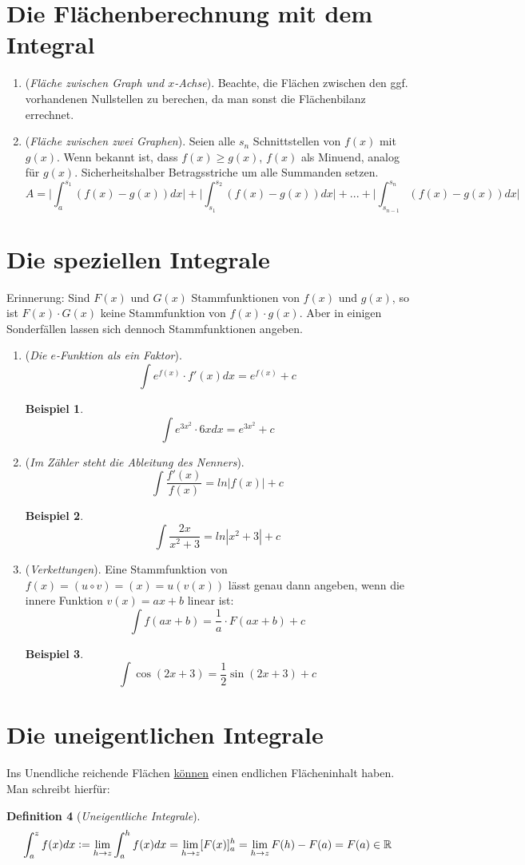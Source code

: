 \documentclass[a4paper,12pt,pointlessnumbers]{scrreprt}
\theoremstyle{definition}
\newtheorem{definition}{Definition}[section]
\newtheorem{example}[definition]{Beispiel}
\begin{document}
\section{Die Flächenberechnung mit dem Integral}
\begin{enumerate}
\item (\emph{Fläche zwischen Graph und $x$-Achse}). Beachte, die Flächen zwischen den ggf. vorhandenen Nullstellen zu berechen, da man sonst die Flächenbilanz errechnet.
\item (\emph{Fläche zwischen zwei Graphen}). Seien alle $s_n$ Schnittstellen von $f(x)$ mit $g(x)$. Wenn bekannt ist, dass $f(x)\geq g(x)$, $f(x)$ als Minuend, analog für $g(x)$. Sicherheitshalber Betragsstriche um alle Summanden setzen.
\[A=\bigl|\int_a^{s_1} (f(x)-g(x))dx \bigr|+ 
\bigl|\int_{s_1}^{s_2} (f(x)-g(x))dx \bigr|+ ... + \bigl|\int_{s_{n-1}}^{s_n} (f(x)-g(x))dx\bigr|\]
\end{enumerate}

\section{Die speziellen Integrale}
Erinnerung: Sind $F(x)$ und $G(x)$ Stammfunktionen von $f(x)$ und $g(x)$, so ist $F(x) \cdot G(x)$ keine Stammfunktion von $f(x) \cdot g(x)$. Aber in einigen Sonderfällen lassen sich dennoch Stammfunktionen angeben. 
\begin{enumerate}
\item (\textit{Die $e$-Funktion als ein Faktor}). \[ \int e^{f(x)}\cdot f'(x) dx= e^{f(x)} + c\]
\begin{example}
\[\int  e^{3x^2}\cdot 6x dx= e^{3x^2} + c\]
\end{example} 
\item (\textit{Im Zähler steht die Ableitung des Nenners}).
\[\int \frac{f'(x)}{f(x)}=ln|f(x)|+c\]
\begin{example}
\[\int \frac{2x}{x^2+3}=ln|x^2+3|+c\]
\end{example}
\item (\textit{Verkettungen}). Eine Stammfunktion von $f(x) = (u \circ v) = (x)=u(v(x))$ lässt genau dann angeben, wenn die innere Funktion $v(x)=ax+b$ linear ist:
\[\int f(ax+b)= \frac{1}{a}\cdot F(ax+b)+c\]
\begin{example}
\[\int \cos (2x+3)= \frac{1}{2} \sin(2x+3)+c\]
\end{example}
\end{enumerate}

\section{Die uneigentlichen Integrale}
Ins Unendliche reichende Flächen \underline{können} einen endlichen Flächeninhalt haben. Man schreibt hierfür:
\begin{definition}[\emph{Uneigentliche Integrale}]
\begin{align*}
\int_a^z f(x) dx \vcentcolon= \lim\limits_{h \to z} \int_a^h f(x) dx = \lim\limits_{h \to z} [F(x)]_a^h =\lim\limits_{h \to z} F(h)-F(a)=F(a)\in \mathbb{R}
\end{align*}
\end{definition}
\end{document}
